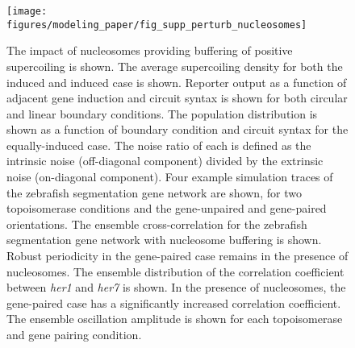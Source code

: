 \documentclass[11pt]{article}
\begin{document}
\begin{figure}[htbp]
    \centering
    {\texttt{[image: figures/modeling\_paper/fig\_supp\_perturb\_nucleosomes]}
    \label{fig:supp:nucleosome_sc_density}
    \label{fig:supp:nucleosome_induction_sweep}
    \label{fig:supp:nucleosome_joint_distribution}
    \label{fig:supp:nucleosome_zinani_examples}
    \label{fig:supp:nucleosome_zinani_crosscorr}
    \label{fig:supp:nucleosome_zinani_correlation_coefficient}
    \label{fig:supp:nucleosome_zinani_oscillation_amplitude}
    }
\end{figure}
\begin{figure}
    \ContinuedFloat
    \caption{The impact of nucleosomes providing buffering of positive supercoiling is shown.
         The average supercoiling density for both the induced and induced case is shown.
         Reporter output as a function of adjacent gene induction and circuit syntax is shown for both circular and linear boundary conditions.
         The population distribution is shown as a function of boundary condition and circuit syntax for the equally-induced case. The noise ratio of each is defined as the intrinsic noise (off-diagonal component) divided by the extrinsic noise (on-diagonal component).
         Four example simulation traces of the zebrafish segmentation gene network are shown, for two topoisomerase conditions and the gene-unpaired and gene-paired orientations.
         The ensemble cross-correlation for the zebrafish segmentation gene network with nucleosome buffering is shown. Robust periodicity in the gene-paired case remains in the presence of nucleosomes.
         The ensemble distribution of the correlation coefficient between \textit{her1} and \textit{her7} is shown. In the presence of nucleosomes, the gene-paired case has a significantly increased correlation coefficient.
         The ensemble oscillation amplitude is shown for each topoisomerase and gene pairing condition.
    }
    \label{fig:top:supp_perturb_nucleosomes}
\end{figure}
\end{document}
